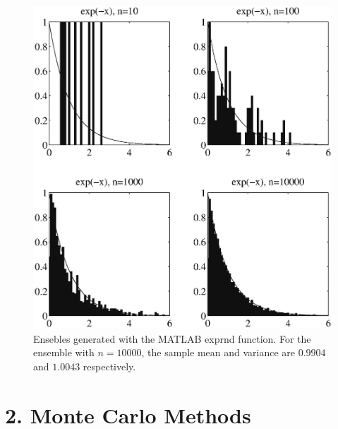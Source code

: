 \documentclass[fleqn, letterpaper]{tufte-handout}
\begin{document}
\begin{figure}
        \includegraphics[width=\textwidth]{problem1e}
        \caption{Ensebles generated with the MATLAB {\ttfamily exprnd} function.
        For the ensemble with $n=10000$, the sample mean and variance are $0.9904$ and $1.0043$ respectively.}
        \label{exprnd}
\end{figure}
{\small
\begin{minipage}{\linewidth}
        
\end{minipage}
}

\section{2. Monte Carlo Methods}
\end{document}
